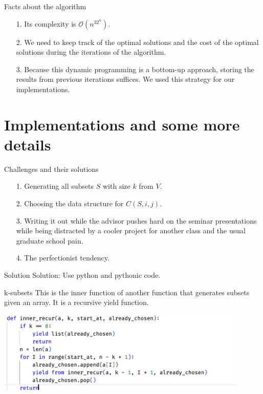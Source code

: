 \documentclass[11pt]{beamer}
\begin{document}
    \begin{frame}{Facts about the algorithm}
        \begin{itemize}
            \item [1.] Its complexity is $\mathcal{O}(n^32^n)$. 
            \item [2.] We need to keep track of the optimal solutions and the cost of the optimal solutions during the iterations of the algorithm. 
            \item [3.] Because this dynamic programming is a bottom-up approach, storing the results from previous iterations suffices. We used this strategy for our implementations. 
        \end{itemize}
    \end{frame}
\section{Implementations and some more details}
    \begin{frame}{Challenges and their solutions}
        \begin{itemize}
            \item [1.] Generating all subsets $S$ with size $k$ from $V$. 
            \item [2.] Choosing the data structure for $C(S, i, j)$. 
            \item [3.] Writing it out while the advisor pushes hard on the seminar presentations while being distracted by a cooler project for another class and the usual graduate school pain. 
            \item [4.] The perfectionist tendency. 
        \end{itemize}
        \pause
        \begin{block}{Solution}
            Solution: Use python and pythonic code. 
        \end{block}
    \end{frame}
    \begin{frame}{k-subsets}
        This is the inner function of another function that generates subsets given an array. It is a recursive yield function. 
        \begin{center}
            \includegraphics[width=12cm]{k_subsets.png}    
        \end{center}
    \end{frame}
\end{document}
